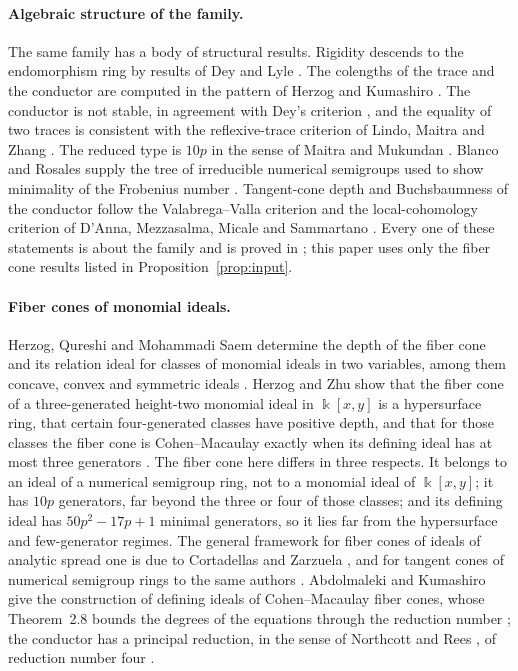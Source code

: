 \documentclass[11pt]{article}
\theoremstyle{definition}
\theoremstyle{remark}
\newcommand{\kfield}{\Bbbk}
\begin{document}
\paragraph{Algebraic structure of the family.}
The same family has a body of structural results. Rigidity descends to the endomorphism ring
by results of Dey and Lyle \cite{DeyLyle2025}. The colengths of the trace and the conductor are
computed in the pattern of Herzog and Kumashiro \cite{HerzogKumashiro2022}. The conductor is not
stable, in agreement with Dey's criterion \cite{Dey2022}, and the equality of two traces is
consistent with the reflexive-trace criterion of Lindo, Maitra and Zhang \cite{LindoMaitraZhang2026}.
The reduced type is $10p$ in the sense of Maitra and Mukundan \cite{MaitraMukundan2023}. Blanco and
Rosales supply the tree of irreducible numerical semigroups used to show minimality of the
Frobenius number \cite{BlancoRosales2013}. Tangent-cone depth and Buchsbaumness of the conductor
follow the Valabrega--Valla criterion \cite{ValabregaValla1978} and the local-cohomology
criterion of D'Anna, Mezzasalma, Micale and Sammartano
\cite{DAnnaMezzasalmaMicale2009,DAnnaMicaleSammartano2011}. Every one of these statements is
about the family and is proved in \cite{SantibanezLeal2026}; this paper uses only the fiber
cone results listed in Proposition~\ref{prop:input}.

\paragraph{Fiber cones of monomial ideals.}
Herzog, Qureshi and Mohammadi Saem determine the depth of the fiber cone and its relation
ideal for classes of monomial ideals in two variables, among them concave, convex and symmetric
ideals \cite{HerzogQureshiSaem2017}. Herzog and Zhu show that the fiber cone of a three-generated
height-two monomial ideal in $\kfield[x,y]$ is a hypersurface ring, that certain four-generated
classes have positive depth, and that for those classes the fiber cone is Cohen--Macaulay
exactly when its defining ideal has at most three generators \cite{HerzogZhu2019}. The fiber
cone here differs in three respects. It belongs to an ideal of a numerical semigroup ring, not
to a monomial ideal of $\kfield[x,y]$; it has $10p$ generators, far beyond the three or four of
those classes; and its defining ideal has $50p^2-17p+1$ minimal generators, so it lies far from
the hypersurface and few-generator regimes. The general framework for fiber cones of ideals of
analytic spread one is due to Cortadellas and Zarzuela \cite{CortadellasZarzuela2007}, and for
tangent cones of numerical semigroup rings to the same authors \cite{CortadellasZarzuela2009}.
Abdolmaleki and Kumashiro give the construction of defining ideals of Cohen--Macaulay fiber
cones, whose Theorem~2.8 bounds the degrees of the equations through the reduction number
\cite{AbdolmalekiKumashiro2024}; the conductor has a principal reduction, in the sense of
Northcott and Rees \cite{NorthcottRees1954}, of reduction number four \cite{SantibanezLeal2026}.
\end{document}
